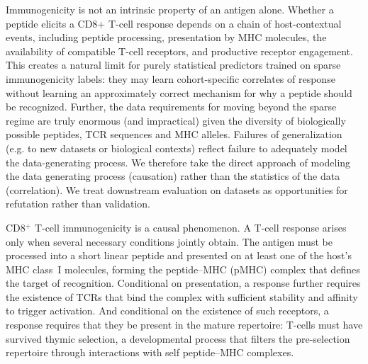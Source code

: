 \documentclass[11pt]{article}
\newif\iforiginalintroduction
\begin{document}
\iforiginalintroduction
Immunogenicity is not an intrinsic property of an antigen alone. Whether a peptide elicits a CD8+ T-cell response depends on a chain of host-contextual events, including peptide processing, presentation by MHC molecules, the availability of compatible T-cell receptors, and productive receptor engagement. This creates a natural limit for purely statistical predictors trained on sparse immunogenicity labels: they may learn cohort-specific correlates of response without learning an approximately correct mechanism for why a peptide should be recognized.  Further, the data requirements for moving beyond the sparse regime are truly enormous (and impractical) given the diversity of biologically possible peptides, TCR sequences and MHC alleles.  
Failures of generalization (e.g. to new datasets or biological contexts) reflect failure to adequately model the data-generating process.
We therefore take the direct approach of modeling the data generating process (causation) rather than the statistics of the data (correlation). We treat downstream evaluation on datasets as opportunities for refutation rather than validation. 


CD8$^{+}$ T-cell immunogenicity is a causal phenomenon.
A T-cell response arises only when several necessary conditions jointly
obtain.
The antigen must be processed into a short linear peptide and
presented on at least one of the host's MHC class~I molecules, forming
the peptide--MHC (pMHC) complex that defines the target of recognition.
Conditional on presentation, a response further requires the existence
of TCRs that bind the complex with sufficient stability and affinity to
trigger activation.
And conditional on the existence of such receptors, a response requires
that they be present in the mature repertoire: T-cells must have
survived thymic selection, a developmental process that filters the
pre-selection repertoire through interactions with self
peptide--MHC complexes.
\end{document}
